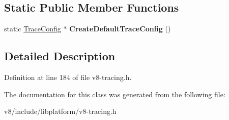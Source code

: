 \subsection*{Static Public Member Functions}
\begin{DoxyCompactItemize}
\item 
\mbox{\label{classv8_1_1platform_1_1tracing_1_1TraceConfig_a63c6f9cd4e9e4b5aa2f2cf3f5f37a8dc}} 
static \mbox{\hyperlink{classv8_1_1platform_1_1tracing_1_1TraceConfig}{Trace\+Config}} $\ast$ {\bfseries Create\+Default\+Trace\+Config} ()
\end{DoxyCompactItemize}


\subsection{Detailed Description}


Definition at line 184 of file v8-\/tracing.\+h.



The documentation for this class was generated from the following file\+:\begin{DoxyCompactItemize}
\item 
v8/include/libplatform/v8-\/tracing.\+h\end{DoxyCompactItemize}
